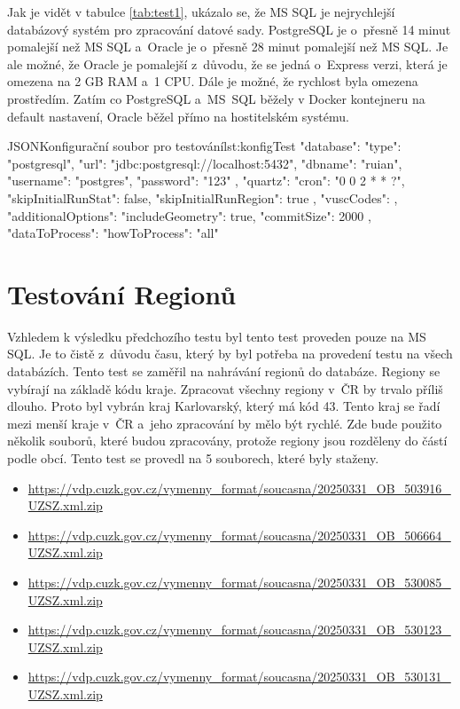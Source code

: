 Jak je vidět v tabulce \ref{tab:test1}, ukázalo se, že MS SQL je nejrychlejší databázový systém pro zpracování datové sady.
PostgreSQL je o~přesně 14 minut pomalejší než MS SQL a~Oracle je o~přesně 28 minut pomalejší než MS SQL.
Je ale možné, že Oracle je pomalejší z~důvodu, že se jedná o~Express verzi, která je omezena na 2 GB RAM a~1 CPU.
Dále je možné, že rychlost byla omezena prostředím. Zatím co PostgreSQL a~MS~SQL běžely v Docker kontejneru na default nastavení,
Oracle běžel přímo na hostitelském systému.

\begin{code}{JSON}{Konfigurační soubor pro testování}{lst:konfigTest}
  {
    "database": {
      "type": "postgresql",
      "url": "jdbc:postgresql://localhost:5432",
      "dbname": "ruian",
      "username": "postgres",
      "password": "123"
    },
    "quartz": {
      "cron": "0 0 2 * * ?",
      "skipInitialRunStat": false,
      "skipInitialRunRegion": true
    },
    "vuscCodes": {},
    "additionalOptions": {
      "includeGeometry": true,
      "commitSize": 2000
    },
    "dataToProcess": {
      "howToProcess": "all"
    }
  }
\end{code}

\section{Testování Regionů}
Vzhledem k výsledku předchozího testu byl tento test proveden pouze na MS SQL.
Je to čistě z~důvodu času, který by byl potřeba na provedení testu na všech databázích.
Tento test se zaměřil na nahrávání regionů do databáze.
Regiony se vybírají na základě kódu kraje. Zpracovat všechny regiony v~ČR by trvalo příliš dlouho.
Proto byl vybrán kraj Karlovarský, který má kód 43.
Tento kraj se řadí mezi menší kraje v~ČR a~jeho zpracování by mělo být rychlé.
Zde bude použito několik souborů, které budou zpracovány, protože regiony jsou rozděleny do částí podle obcí.
Tento test se provedl na 5 souborech, které byly staženy.
\begin{itemize}
  \item \url{https://vdp.cuzk.gov.cz/vymenny_format/soucasna/20250331_OB_503916_UZSZ.xml.zip}
  \item \url{https://vdp.cuzk.gov.cz/vymenny_format/soucasna/20250331_OB_506664_UZSZ.xml.zip}
  \item \url{https://vdp.cuzk.gov.cz/vymenny_format/soucasna/20250331_OB_530085_UZSZ.xml.zip}
  \item \url{https://vdp.cuzk.gov.cz/vymenny_format/soucasna/20250331_OB_530123_UZSZ.xml.zip}
  \item \url{https://vdp.cuzk.gov.cz/vymenny_format/soucasna/20250331_OB_530131_UZSZ.xml.zip}
\end{itemize}

